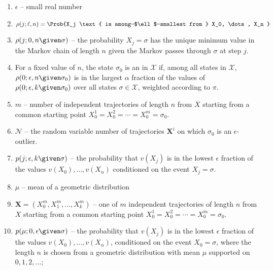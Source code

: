 \documentclass[12pt]{article}
\begin{document}
\begin{enumerate}
    \item
        \( \epsilon \) -- small real number
    \item
        \[
          \rho(j; \ell, n) = \Prob{X_j \text{ is
              among-$\ell$-smallest from } X_0, \dots, X_n }
        \]
    \item
        \( \rho(j; 0, n \given \sigma) \) -- the probability \( X_j =
        \sigma \) has the unique minimum value in the Markov chain of
        length \( n \) given the Markov passes through \( \sigma \) at
        step \( j \).
    \item
        For a fixed value of \( n \), the state \( \sigma_0 \) is an
         in \( \mathcal{X} \) if,
        among all states in \( \mathcal{X} \), \( \rho(0; \epsilon, n
        \given \sigma_{0}) \) is in the largest \( \alpha \) fraction of
        the values of \( \rho(0; \epsilon, k \given \sigma_{0}) \) over
        all states \( \sigma \in \mathcal{X} \), weighted according to \(
        \pi \).
    \item
        \( m \) -- number of independent trajectories of length \( n \)
        from \( X \) starting from a common starting point \( X_0^1 = X_0^2
        = \cdots = X_0^m = \sigma_0 \).
    \item
        \( \mathcal{N} \) -- the random variable number of trajectories \(
        \mathbf{X}^i \) on which \( \sigma_0 \) is an \( \epsilon \)-outlier.
    \item
        \( p(j; \epsilon,k \given \sigma) \) -- the probability that \(
        v(X_j) \) is in the lowest \( \epsilon \) fraction of the values
        \( v(X_0), \dots, v(X_n) \) conditioned on the event \( X_j =
        \sigma \).
    \item
        \( \mu \) -- mean of a geometric distribution
    \item
        \( \mathbf{X} = (X_0^m, X_1^m, \dots, X_k^m) \) -- one of \( m \)
        independent trajectories of length \( n \) from \( X \) starting
        from a common starting point \( X_0^1 = X_0^2 = \cdots = X_0^m =
        \sigma_0 \).
    \item
        \( p(\mu; 0, \epsilon \given \sigma) \) -- the probability that \(
        v(X_j) \) is in the lowest \( \epsilon \) fraction of the values
        \( v(X_0), \dots, v(X_n) \), conditioned on the event \( X_0 =
        \sigma \), where the length \( n \) is chosen from a geometric
        distribution with mean \( \mu \) supported on \( 0,1,2,\dots \);
\end{enumerate}
\end{document}
